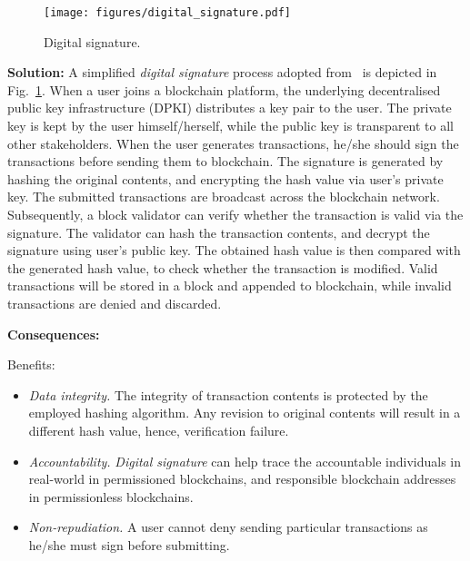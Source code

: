 \documentclass{article}
\begin{document}
\begin{figure}[!ht]
	\centering
	\texttt{[image: figures/digital\_signature.pdf]}
	\caption{Digital signature.}
	\label{pic:digital_signature}
\end{figure}

\vspace{0.5em}\noindent \textbf{Solution:} A simplified \textit{digital signature} process adopted from~\cite{hashizume2009digital} is depicted in Fig.~\ref{pic:digital_signature}. When a user joins a blockchain platform, the underlying decentralised public key infrastructure (DPKI) distributes a key pair to the user. The private key is kept by the user himself/herself, while the public key is transparent to all other stakeholders. When the user generates transactions, he/she should sign the transactions before sending them to blockchain. The signature is generated by hashing the original contents, and encrypting the hash value via user's private key. The submitted transactions are broadcast across the blockchain network. Subsequently, a block validator can verify whether the transaction is valid via the signature. The validator can hash the transaction contents, and decrypt the signature using user's public key. The obtained hash value is then compared with the generated hash value, to check whether the transaction is modified. Valid transactions will be stored in a block and appended to blockchain, while invalid transactions are denied and discarded.



\vspace{0.5em}\noindent \textbf{Consequences:} 

Benefits:
\begin{itemize}
  \item \textit{Data integrity.} The integrity of transaction contents is protected by the employed hashing algorithm. Any revision to original contents will result in a different hash value, hence, verification failure.

  
  \item \textit{Accountability.} \textit{Digital signature} can help trace the accountable individuals in real-world in permissioned blockchains, and responsible blockchain addresses in permissionless blockchains.

  
  \item \textit{Non-repudiation.} A user cannot deny sending particular transactions as he/she must sign before submitting.
\end{itemize}
\end{document}
